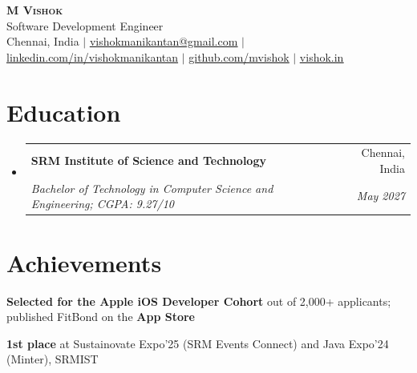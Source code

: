 \documentclass[a4paper,11pt]{article}
\makeatletter
\newcommand{\resumeSubheading}[4]{
  \vspace{-1pt}\item
    \begin{tabular*}{0.97\textwidth}[t]{l@{\extracolsep{\fill}}r}
      \textbf{#1} & #2 \\
      \textit{\small#3} & \textit{\small #4} \\
    \end{tabular*}\vspace{-5pt}
}
\newcommand{\resumeSubHeadingListStart}{\begin{itemize}[leftmargin=0.15in, label={}]}
\newcommand{\resumeSubHeadingListEnd}{\end{itemize}}
\makeatother
\begin{document}
\begin{center}
    \textbf{\Huge \scshape M Vishok} \\ \vspace{3pt}
    {\large Software Development Engineer} \\ \vspace{3pt}
    \small Chennai, India $|$ \href{mailto:vishokmanikantan@gmail.com}{\underline{vishokmanikantan@gmail.com}} $|$
    \href{https://linkedin.com/in/vishokmanikantan}{\underline{linkedin.com/in/vishokmanikantan}} $|$
    \href{https://github.com/mvishok}{\underline{github.com/mvishok}} $|$
    \href{https://vishok.in}{\underline{vishok.in}}
\end{center}

\section{Education}
  \resumeSubHeadingListStart
    \resumeSubheading
      {SRM Institute of Science and Technology}{Chennai, India}
      {Bachelor of Technology in Computer Science and Engineering; CGPA: 9.27/10}{May 2027}
  \resumeSubHeadingListEnd

\section{Achievements}
 \begin{itemize}[leftmargin=0.3in, itemsep=1pt, topsep=2pt, parsep=0pt]
    \small{\item \textbf{Selected for the Apple iOS Developer Cohort} out of 2,000+ applicants; published FitBond on the \textbf{App Store}}
    \small{\item \textbf{1st place} at Sustainovate Expo'25 (SRM Events Connect) and Java Expo'24 (Minter), SRMIST}
 \end{itemize}

\end{document}
